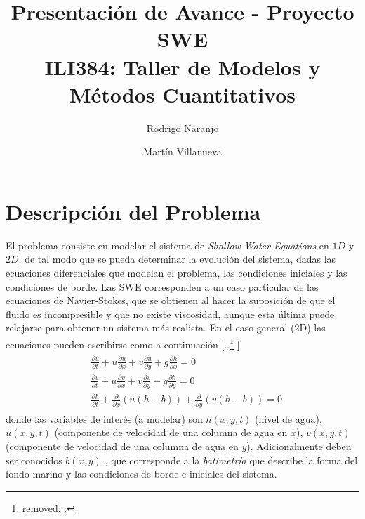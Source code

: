 \documentclass[spanish]{article} %
\title{Presentación de Avance - Proyecto SWE \\ILI384: Taller de Modelos y Métodos Cuantitativos}
\author{Rodrigo Naranjo \and Martín Villanueva}
\date{\DIFdelbegin \DIFdel{11 de noviembre 2015}\DIFdelend \DIFaddbegin \DIFadd{5 de Enero 2016}\DIFaddend }
\providecommand{\DIFaddtex}[1]{{\protect\color{blue} \sf #1}} %
\providecommand{\DIFdeltex}[1]{{\protect\color{red} [..\footnote{removed: #1} ]}} %
\providecommand{\DIFaddbegin}{} %
\providecommand{\DIFaddend}{} %
\providecommand{\DIFdelbegin}{} %
\providecommand{\DIFdelend}{} %
\providecommand{\DIFadd}[1]{\texorpdfstring{\DIFaddtex{#1}}{#1}} %
\providecommand{\DIFdel}[1]{\texorpdfstring{\DIFdeltex{#1}}{}} %
\begin{document}
\maketitle

\thispagestyle{empty}


\section{Descripción del Problema}
El problema consiste en modelar el sistema de \textit{Shallow Water Equations} en $1D$ y $2D$, de tal modo
que se pueda determinar la evolución del sistema, dadas las ecuaciones diferenciales que modelan el problema,
las condiciones iniciales y las condiciones de borde. Las SWE corresponden a un caso particular de las ecuaciones
de Navier-Stokes, que se obtienen al hacer la suposición de que el fluido es incompresible y que no existe viscosidad, aunque esta última puede relajarse para obtener un sistema más realista. En el caso general (2D) las ecuaciones pueden
escribirse como a continuación
\DIFdelbegin \DIFdel{:
}%
\DIFdelend \DIFaddbegin \begin{align}
\begin{split}
 & \frac{\partial u}{\partial t} + u \frac{\partial u}{\partial x} + v \frac{\partial u}{\partial y} + g \frac{\partial h}{\partial x} = 0 \\
 & \frac{\partial v}{\partial t} + u \frac{\partial v}{\partial x} + v \frac{\partial v}{\partial y} + g \frac{\partial h}{\partial y} = 0 \\
 & \frac{\partial h}{\partial t} + \frac{\partial }{\partial x}(u(h-b)) + \frac{\partial }{\partial y}(v(h-b)) = 0
\end{split}
\end{align}
\DIFaddend donde las variables de interés (a modelar) son $h(x,y,t)$ (nivel de agua), $u(x,y,t)$ (componente de velocidad de una columna de
agua en $x$), $v(x,y,t)$ (componente de velocidad de una columna de agua en $y$). Adicionalmente deben ser conocidos $b(x,y)$\DIFaddbegin \DIFadd{, }\DIFaddend que corresponde a la \textit{batimetría} que describe la forma del fondo marino  y las condiciones de borde e iniciales del sistema.
\end{document}

